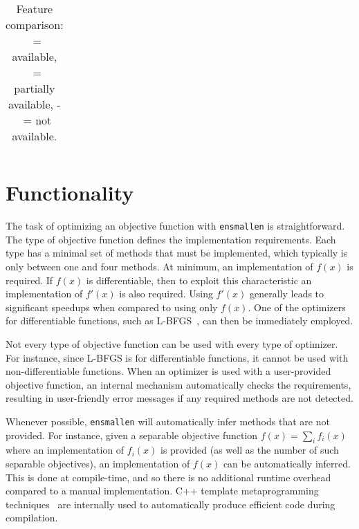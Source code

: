 \documentclass[twoside,11pt]{article}
\begin{document}
\begin{table}[!t]
\begin{tabular}{@{} cl*{9}c @{}}
        \cmidrule[1pt]{2-11}
    \end{tabular}
\vspace*{-0.5em}
\caption{
Feature comparison:
\CIRCLE~= available,
\LEFTcircle~= partially available,
-~= not available.
\label{tab:comparison}
\vspace{-1.5ex}
}
\end{table}

\section{Functionality}
\label{sec:overview}

The task of optimizing an objective function with {\tt ensmallen} is straightforward.
The type of objective function defines the implementation requirements.
Each type has a minimal set of methods that must be implemented,
which typically is only between one and four methods.
At minimum, 
an implementation of $f(x)$ is required.
If $f(x)$ is differentiable,
then to exploit this characteristic an implementation of $f'(x)$ is also required.
Using $f'(x)$ generally leads to significant speedups when compared to using only $f(x)$.
One of the optimizers for differentiable functions,
such as L-BFGS~\citep{liu1989limited},
can then be immediately employed.

Not every type of objective function can be used with every type of optimizer.
For instance, since L-BFGS is for differentiable functions,
it cannot be used with non-differentiable functions.
When an optimizer is used with a user-provided objective function,
an internal mechanism automatically checks the requirements,
resulting in user-friendly error messages if any required methods are not detected.

Whenever possible, {\tt ensmallen} will automatically infer methods that are
not provided.  For instance, given a separable objective function $f(x) = \sum_i
f_i(x)$ where an implementation of $f_i(x)$ is provided (as well as the number
of such separable objectives), an implementation of $f(x)$ can be automatically
inferred.  This is done at compile-time, and so there is no additional runtime
overhead compared to a manual implementation.  C++ template metaprogramming
techniques~\citep{Abrahams_2004,alexandrescu2001modern} are
internally used to automatically produce efficient code during compilation.
\end{document}
